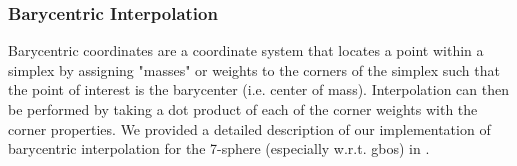 \documentclass[final,twocolumn,12pt]{elsarticle}
\begin{document}
\subsubsection{Barycentric Interpolation}
\label{sec:methods:interp:bary}

Barycentric coordinates are a coordinate system that locates a point within a simplex by assigning "masses" or weights to the corners of the simplex such that the point of interest is the barycenter (i.e. center of mass). Interpolation can then be performed by taking a dot product of each of the corner weights with the corner properties. We provided a detailed description of our implementation of barycentric interpolation for the 7-sphere (especially w.r.t. \glspl{gbo}) in \citet{bairdBarycentricInterpolation7SphereUnderReview}.

\subsubsection{}
\label{sec:methods:interp:gpr}
\end{document}
